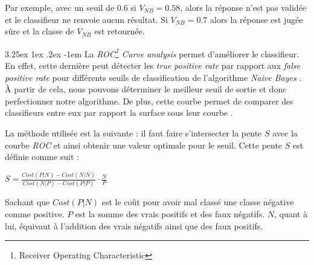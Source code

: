 \documentclass[a4paper, 11pt]{article}
\makeatletter
\renewcommand\paragraph{\@startsection{paragraph}{5}{\z@}%
  {3.25ex \@plus1ex \@minus.2ex}%
  {-1em}%
  {\normalfont\normalsize\bfseries}}
\makeatother
\begin{document}
Par exemple, avec un seuil de $0.6$ si $V_{NB} = 0.58$, alors la réponse n'est pas validée et le classifieur ne renvoie aucun
résultat. Si $V_{NB} = 0.7$ alors la réponse est jugée sûre et la classe de $V_{NB}$ est retournée. 

\paragraph{}\label{section roc curve analysis}
La \textit{ROC\footnote{Receiver Operating Characteristic} Curve analysis} permet d'améliorer le classifieur. 
En effet, cette dernière peut détecter les \textit{true positive rate} par rapport aux \textit{false positive rate} 
pour différents seuils de classification de l'algorithme \textit{Naive Bayes} \cite{machine_learning_automated_trading}. 
À partir de cela, nous pouvons déterminer le meilleur seuil de sortie et donc perfectionner notre algorithme.
De plus, cette courbe permet de comparer des classifieurs entre eux par rapport
la surface sous leur courbe \cite{machine_learning_automated_trading}.

La méthode utilisée est la suivante \cite{machine_learning_automated_trading}: il faut faire s'intersecter 
la pente $S$ avec la courbe \textit{ROC} et ainsi obtenir une valeur optimale pour le seuil.
Cette pente $S$ est définie comme suit \cite{machine_learning_automated_trading}:
\begin{center}
$S = \frac{Cost(P|N) - Cost(N|N)}{Cost(N|P) - Cost(P|P)} \cdot \frac{N}{P}$
\end{center}
Sachant que $Cost(P|N)$ est le coût pour avoir mal classé une classe négative comme positive. 
$P$ est la somme des vrais positifs et des faux négatifs. $N$, quant à lui, équivaut à l'addition des vrais négatifs ainsi que des faux positifs.
\end{document}
